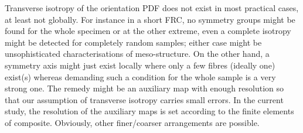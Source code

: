  	Transverse isotropy of the orientation PDF does not exist in most practical cases, at least not globally. For instance in a short FRC, no symmetry groups might be found for the whole specimen or at the other extreme, even a complete isotropy might be detected for completely random samples; either case might be unsophisticated characterisations of meso-structure. On the other hand, a symmetry axis might just exist locally where only a few fibres (ideally one) exist(s) whereas demanding such a condition for the whole sample is a very strong one. The remedy might be an auxiliary map with enough resolution so that our assumption of transverse isotropy carries small errors. In the current study, the resolution of the auxiliary maps is set according to the finite elements of composite. Obviously, other finer/coarser arrangements are possible. 

